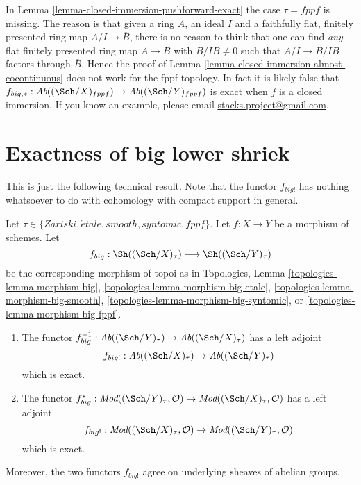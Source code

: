 \begin{remark}
\label{remark-fppf-closed-immersion-not-closed}
In Lemma \ref{lemma-closed-immersion-pushforward-exact} the case $\tau = fppf$
is missing. The reason is that given a ring $A$, an ideal $I$ and a
faithfully flat, finitely presented ring map $A/I \to \overline{B}$, there
is no reason to think that one can find {\it any} flat finitely presented ring
map $A \to B$ with $B/IB \not = 0$ such that $A/I \to B/IB$ factors through
$\overline{B}$. Hence the proof of
Lemma \ref{lemma-closed-immersion-almost-cocontinuous}
does not work for the fppf topology.
In fact it is likely false that
$f_{big, *} : \textit{Ab}((\Sch/X)_{fppf})
\to \textit{Ab}((\Sch/Y)_{fppf})$
is exact when $f$ is a closed immersion.
If you know an example, please email
\href{mailto:stacks.project@gmail.com}{stacks.project@gmail.com}.
\end{remark}












\section{Exactness of big lower shriek}
\label{section-exactness-lower-shriek}

\noindent
This is just the following technical result. Note that the functor $f_{big!}$
has nothing whatsoever to do with cohomology with compact support in
general.

\begin{lemma}
\label{lemma-exactness-lower-shriek}
Let $\tau \in \{Zariski, \acute{e}tale, smooth, syntomic, fppf\}$.
Let $f : X \to Y$ be a morphism of schemes. Let
$$
f_{big} :
\Sh((\Sch/X)_\tau)
\longrightarrow
\Sh((\Sch/Y)_\tau)
$$
be the corresponding morphism of topoi as in
Topologies, Lemma
\ref{topologies-lemma-morphism-big},
\ref{topologies-lemma-morphism-big-etale},
\ref{topologies-lemma-morphism-big-smooth},
\ref{topologies-lemma-morphism-big-syntomic}, or
\ref{topologies-lemma-morphism-big-fppf}.
\begin{enumerate}
\item The functor
$f_{big}^{-1} : \textit{Ab}((\Sch/Y)_\tau) \to \textit{Ab}((\Sch/X)_\tau)$
has a left adjoint
$$
f_{big!} : \textit{Ab}((\Sch/X)_\tau) \to \textit{Ab}((\Sch/Y)_\tau)
$$
which is exact.
\item The functor
$f_{big}^* :
\textit{Mod}((\Sch/Y)_\tau, \mathcal{O})
\to
\textit{Mod}((\Sch/X)_\tau, \mathcal{O})$
has a left adjoint
$$
f_{big!} :
\textit{Mod}((\Sch/X)_\tau, \mathcal{O})
\to
\textit{Mod}((\Sch/Y)_\tau, \mathcal{O})
$$
which is exact.
\end{enumerate}
Moreover, the two functors $f_{big!}$ agree on underlying sheaves
of abelian groups.
\end{lemma}

